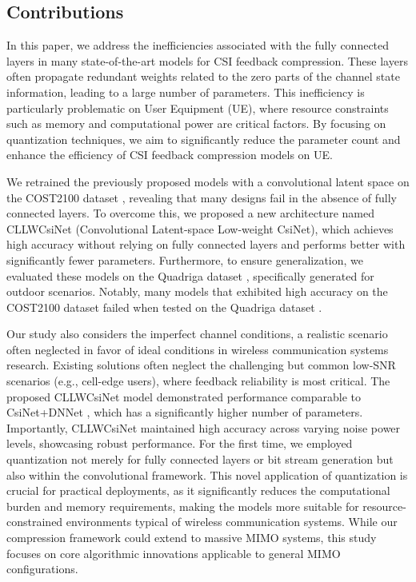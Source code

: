 \documentclass[lettersize,journal]{IEEEtran}
\begin{document}
\subsection{Contributions}

In this paper, we address the inefficiencies associated with the fully connected layers in many state-of-the-art models for CSI feedback compression. These layers often propagate redundant weights related to the zero parts of the channel state information, leading to a large number of parameters. This inefficiency is particularly problematic on User Equipment (UE), where resource constraints such as memory and computational power are critical factors. By focusing on quantization techniques, we aim to significantly reduce the parameter count and enhance the efficiency of CSI feedback compression models on UE.

We retrained the previously proposed models with a convolutional latent space on the COST2100 dataset \cite{abf}, revealing that many designs fail in the absence of fully connected layers. To overcome this, we proposed a new architecture named CLLWCsiNet (Convolutional Latent-space Low-weight CsiNet), which achieves high accuracy without relying on fully connected layers and performs better with significantly fewer parameters. Furthermore, to ensure generalization, we evaluated these models on the Quadriga dataset \cite{abt}, specifically generated for outdoor scenarios. Notably, many models that exhibited high accuracy on the COST2100 dataset \cite{abf} failed when tested on the Quadriga dataset \cite{abt}.

Our study also considers the imperfect channel conditions, a realistic scenario often neglected in favor of ideal conditions in wireless communication systems research. Existing solutions often neglect the challenging but common low-SNR scenarios (e.g., cell-edge users), where feedback reliability is most critical. The proposed CLLWCsiNet model demonstrated performance comparable to CsiNet+DNNet \cite{abw}, which has a significantly higher number of parameters. Importantly, CLLWCsiNet maintained high accuracy across varying noise power levels, showcasing robust performance. For the first time, we employed quantization not merely for fully connected layers or bit stream generation but also within the convolutional framework. This novel application of quantization is crucial for practical deployments, as it significantly reduces the computational burden and memory requirements, making the models more suitable for resource-constrained environments typical of wireless communication systems.
While our compression framework could extend to massive MIMO systems, this study focuses on core algorithmic innovations applicable to general MIMO configurations.
\end{document}
